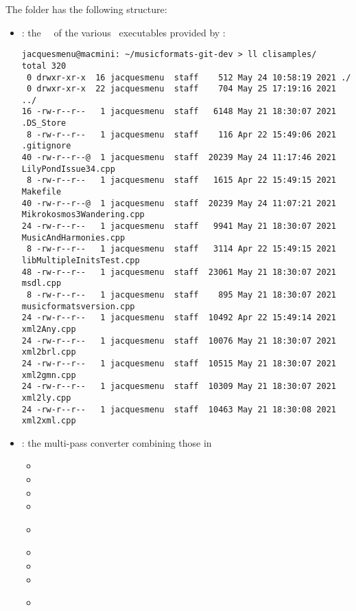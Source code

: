 The  folder has the following structure:%

\begin{itemize}

\item {} : the \mainFunction\ \functions\ of the various \CLI\ executables provided by \mf: %
\begin{lstlisting}[language=Terminal]
jacquesmenu@macmini: ~/musicformats-git-dev > ll clisamples/
total 320
 0 drwxr-xr-x  16 jacquesmenu  staff    512 May 24 10:58:19 2021 ./
 0 drwxr-xr-x  22 jacquesmenu  staff    704 May 25 17:19:16 2021 ../
16 -rw-r--r--   1 jacquesmenu  staff   6148 May 21 18:30:07 2021 .DS_Store
 8 -rw-r--r--   1 jacquesmenu  staff    116 Apr 22 15:49:06 2021 .gitignore
40 -rw-r--r--@  1 jacquesmenu  staff  20239 May 24 11:17:46 2021 LilyPondIssue34.cpp
 8 -rw-r--r--   1 jacquesmenu  staff   1615 Apr 22 15:49:15 2021 Makefile
40 -rw-r--r--@  1 jacquesmenu  staff  20239 May 24 11:07:21 2021 Mikrokosmos3Wandering.cpp
24 -rw-r--r--   1 jacquesmenu  staff   9941 May 21 18:30:07 2021 MusicAndHarmonies.cpp
 8 -rw-r--r--   1 jacquesmenu  staff   3114 Apr 22 15:49:15 2021 libMultipleInitsTest.cpp
48 -rw-r--r--   1 jacquesmenu  staff  23061 May 21 18:30:07 2021 msdl.cpp
 8 -rw-r--r--   1 jacquesmenu  staff    895 May 21 18:30:07 2021 musicformatsversion.cpp
24 -rw-r--r--   1 jacquesmenu  staff  10492 Apr 22 15:49:14 2021 xml2Any.cpp
24 -rw-r--r--   1 jacquesmenu  staff  10076 May 21 18:30:07 2021 xml2brl.cpp
24 -rw-r--r--   1 jacquesmenu  staff  10515 May 21 18:30:07 2021 xml2gmn.cpp
24 -rw-r--r--   1 jacquesmenu  staff  10309 May 21 18:30:07 2021 xml2ly.cpp
24 -rw-r--r--   1 jacquesmenu  staff  10463 May 21 18:30:08 2021 xml2xml.cpp
\end{lstlisting}

\item {} : the multi-pass converter combining those in 

\begin{itemize}
  \item {}
  \item {}
  \item {}
  \item {}
  \item {}\\[-0.5ex]

  \item {}
  \item {}
  \item {}
  \item {}\\[-0.5ex]


\end{itemize}
\end{itemize}
